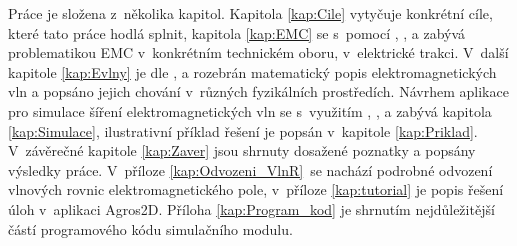 Práce je složena z~několika kapitol. Kapitola \ref{kap:Cile} vytyčuje konkrétní cíle, které tato práce hodlá splnit, kapitola \ref{kap:EMC} se s~pomocí \cite{emc_trakce}, \cite{nfr}, \cite{emc_encyklopedie} a \cite{csn} zabývá problematikou EMC v~konkrétním technickém oboru, v~elektrické trakci. V~další kapitole \ref{kap:Evlny} je dle \cite{emp}, \cite{umt} a \cite{tripak} rozebrán matematický popis elektromagnetických vln a popsáno jejich chování v~různých fyzikálních prostředích. Návrhem aplikace pro simulace šíření elektromagnetických vln se s~využitím \cite{num}, \cite{hpfem}, \cite{gk_kaw} a \cite{gk_tichy} zabývá kapitola \ref{kap:Simulace}, ilustrativní příklad řešení je popsán v~kapitole \ref{kap:Priklad}. V~závěrečné kapitole \ref{kap:Zaver} jsou shrnuty dosažené poznatky a popsány výsledky práce. V~příloze \ref{kap:Odvozeni_VlnR}~se nachází podrobné odvození vlnových rovnic elektromagnetického pole, v~příloze \ref{kap:tutorial} je popis řešení úloh v~aplikaci Agros2D. Příloha \ref{kap:Program_kod} je shrnutím nejdůležitější částí programového kódu simulačního modulu.

